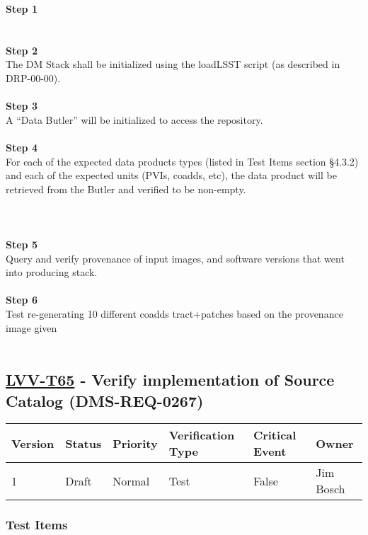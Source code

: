 \textbf{Step 1}\\
~\\
~\\
\textbf{Step 2}\\
The DM Stack shall be initialized using the loadLSST script (as
described in DRP-00-00).\\
~\\
\textbf{Step 3}\\
A ``Data Butler'' will be initialized to access the repository.\\
~\\
\textbf{Step 4}\\
For each of the expected data products types (listed in Test Items
section §4.3.2) and each of the expected units (PVIs, coadds, etc), the
data product will be retrieved from the Butler and verified to be
non-empty.\\
~\\
~\\
~\\
\textbf{Step 5}\\
Query and verify provenance of input images, and software versions that
went into producing stack.\\
~\\
\textbf{Step 6}\\
Test re-generating 10 different coadds tract+patches based on the
provenance image given\\
~\\

\hypertarget{lvv-t65---verify-implementation-of-source-catalog-dms-req-0267}{%
\subsection{\texorpdfstring{\href{https://jira.lsstcorp.org/secure/Tests.jspa\#/testCase/LVV-T65}{LVV-T65}
- Verify implementation of Source Catalog
(DMS-REQ-0267)}{LVV-T65 - Verify implementation of Source Catalog (DMS-REQ-0267)}}\label{lvv-t65---verify-implementation-of-source-catalog-dms-req-0267}}

\begin{longtable}[]{@{}llllll@{}}
\toprule
Version & Status & Priority & Verification Type & Critical Event &
Owner\tabularnewline
\midrule
\endhead
1 & Draft & Normal & Test & False & Jim Bosch\tabularnewline
\bottomrule
\end{longtable}

\hypertarget{test-items-41}{%
\subsubsection{Test Items}\label{test-items-41}}

